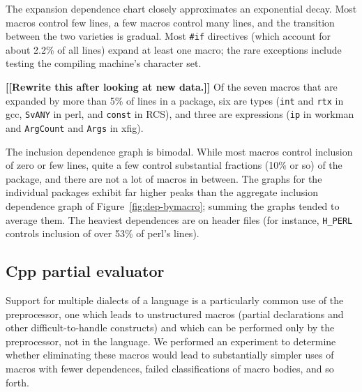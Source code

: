 \documentclass[10pt]{article}
\newcommand{\comment}[1]{\textbf{[[#1]]}}
\newcommand{\pkg}[1]{\textsf{#1}}
\begin{document}

The expansion dependence chart closely approximates an exponential decay.
Most macros control few lines, a few macros control many lines, and the
transition between the two varieties is gradual.  Most {\tt \#if}
directives (which account for about 2.2\% of all lines) expand at least one
macro; the rare exceptions include testing the compiling machine's
character set.

\comment{Rewrite this after looking at new data.}
Of the seven macros that are expanded by more than 5\% of lines in a package,
six are types ({\tt int} and {\tt rtx} in \pkg{gcc}, {\tt SvANY} in \pkg{perl}, and {\tt const} in
RCS), and three are expressions
({\tt ip} in \pkg{workman} and {\tt ArgCount} and {\tt Args} in
\pkg{xfig}).

% 
% 



The inclusion dependence graph is bimodal.  While most macros control
inclusion of zero or few lines, quite a few control substantial
fractions (10\% or so) of the package, and there are not a lot of macros in
between.  The graphs for the individual packages exhibit far higher peaks
than the aggregate inclusion dependence graph of
Figure~\ref{fig:dep-bymacro}; summing the graphs tended to average them.
The heaviest dependences are on header files (for instance, \verb|H_PERL|
controls inclusion of over 53\% of \pkg{perl}'s lines).



\subsection{Cpp partial evaluator}

Support for multiple dialects of a language is a particularly common use of
the preprocessor, one which leads to unstructured macros (partial
declarations and other difficult-to-handle constructs) and which can be
performed only by the preprocessor, not in the language.  We performed an
experiment to determine whether eliminating these macros would lead to
substantially simpler uses of macros with fewer dependences, failed
classifications of macro bodies, and so forth.
\end{document}
